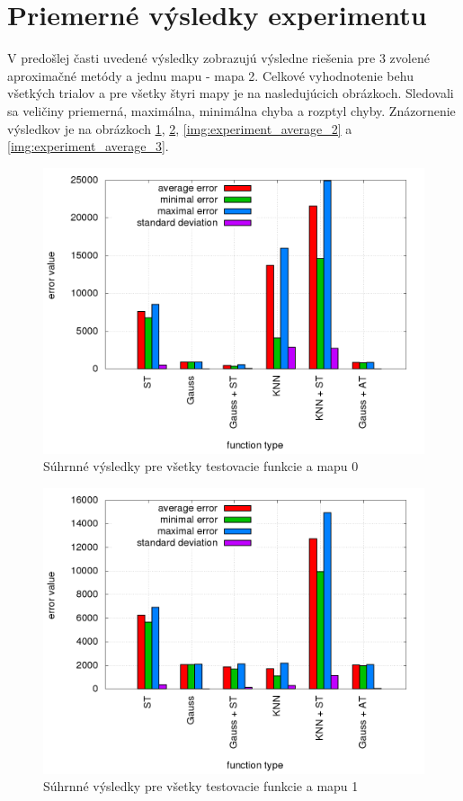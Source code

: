 \newpage
\section {Priemerné výsledky experimentu}

V predošlej časti uvedené výsledky zobrazujú výsledne riešenia pre 3 zvolené aproximačné
metódy a jednu mapu - mapa 2. Celkové vyhodnotenie behu všetkých trialov a pre všetky
štyri mapy je na nasledujúcich obrázkoch. Sledovali sa veličiny priemerná, maximálna, minimálna chyba
a rozptyl chyby. Znázornenie výsledkov je na obrázkoch \ref{img:experiment_average_0},
\ref{img:experiment_average_1}, \ref{img:experiment_average_2} a \ref{img:experiment_average_3}.

\begin{figure}[!htb]
\centering
\includegraphics[scale=.4]{../../results_q_learning/map_0/trials_average_results.png}
\caption{Súhrnné výsledky pre všetky testovacie funkcie a mapu 0}
\label{img:experiment_average_0}
\end{figure}

\begin{figure}[!htb]
\centering
\includegraphics[scale=.4]{../../results_q_learning/map_1/trials_average_results.png}
\caption{Súhrnné výsledky pre všetky testovacie funkcie a mapu 1}
\label{img:experiment_average_1}
\end{figure}

